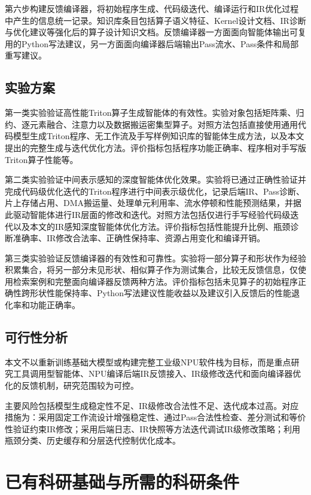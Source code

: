 第六步构建反馈编译器，将初始程序生成、代码级迭代、编译运行和IR优化过程中产生的信息统一记录。知识库条目包括算子语义特征、Kernel设计文档、IR诊断与优化建议等强化后的算子设计知识文档。反馈编译器一方面面向智能体输出可复用的Python写法建议，另一方面面向编译器后端输出Pass流水、Pass条件和局部重写建议。

\section{实验方案}

第一类实验验证高性能Triton算子生成智能体的有效性。实验对象包括矩阵乘、归约、逐元素融合、注意力以及数据搬运密集型算子。对照方法包括直接使用通用代码模型生成Triton程序、无工作流及手写样例知识库的智能体生成方法，以及本文提出的完整生成与迭代优化方法。评价指标包括程序功能正确率、程序相对手写版Triton算子性能等。

第二类实验验证中间表示感知的深度智能体优化效果。实验将已通过正确性验证并完成代码级优化迭代的Triton程序进行中间表示级优化，记录后端IR、Pass诊断、片上存储占用、DMA搬运量、处理单元利用率、流水停顿和性能预测结果，并据此驱动智能体进行IR层面的修改和迭代。对照方法包括仅进行手写经验代码级迭代以及本文的IR感知深度智能体优化方法。评价指标包括性能提升比例、瓶颈诊断准确率、IR修改合法率、正确性保持率、资源占用变化和编译开销。

第三类实验验证反馈编译器的有效性和可靠性。实验将一部分算子和形状作为经验积累集合，将另一部分未见形状、相似算子作为测试集合，比较无反馈信息，仅使用检索案例和完整面向编译器反馈两种方法。评价指标包括未见算子的初始程序正确性跨形状性能保持率、Python写法建议性能收益以及建议引入反馈后的性能退化率和功能正确率。

\section{可行性分析}

本文不以重新训练基础大模型或构建完整工业级NPU软件栈为目标，而是重点研究工具调用型智能体、NPU编译后端IR反馈接入、IR级修改迭代和面向编译器优化的反馈机制，研究范围较为可控。

主要风险包括模型生成稳定性不足、IR级修改合法性不足、迭代成本过高。对应措施为：采用固定工作流设计增强稳定性、通过Pass合法性检查、差分测试和等价性验证约束IR修改；采用后端日志、IR快照等方法迭代调试IR级修改策略；利用瓶颈分类、历史缓存和分层迭代控制优化成本。

\chapter{已有科研基础与所需的科研条件}

